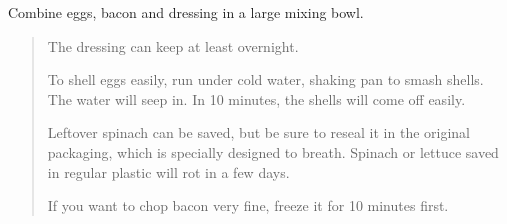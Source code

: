 \begin{multicols*}{3}
Combine eggs, bacon and dressing in a large mixing bowl.

\begin{quote}
The dressing can keep at least overnight.

To shell eggs easily, run under cold water, shaking pan to smash shells. The water will seep in. In 10 minutes, the shells will come off easily.

Leftover spinach can be saved, but be sure to reseal it in the original packaging, which is specially designed to breath. Spinach or lettuce saved in regular plastic will rot in a few days.

If you want to chop bacon very fine, freeze it for 10 minutes first.
\end{quote}

\end{multicols*}

\clearpage
